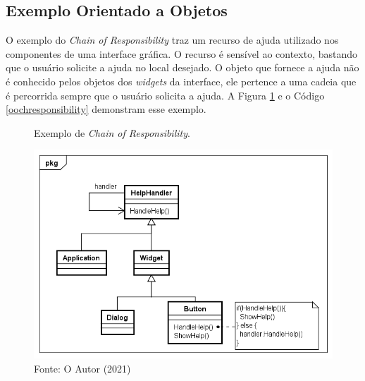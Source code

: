 \subsection*{Exemplo Orientado a Objetos}

O exemplo do \textit{Chain of Responsibility} traz um recurso 
de ajuda utilizado nos componentes de uma 
interface gráfica. O recurso é sensível ao contexto, 
bastando que o usuário solicite a ajuda no local 
desejado. O objeto que fornece a ajuda não é 
conhecido pelos objetos dos \textit{widgets} da 
interface, ele pertence a uma cadeia que é 
percorrida sempre que o usuário solicita 
a ajuda. A Figura \ref{chain_exemplo} e o Código 
\ref{oochresponsibility} demonstram esse exemplo.

\begin{figure}[htb]
	\caption{\label{chain_exemplo}Exemplo de \textit{Chain of Responsibility}.}
	\begin{center}
	    \includegraphics[scale=0.5]{5_padroes-contexto-funcional/5.3_comportamentais/5.3.01_chain-of-responsibility/chainofresponsibility_exemplo.png}
	\end{center}
  \caption*{Fonte: O Autor (2021)}
\end{figure}

